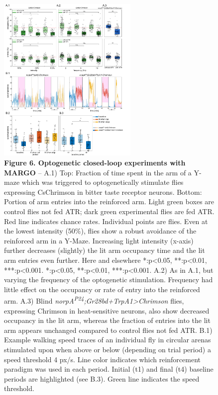 \documentclass[10pt]{article}
\begin{document}
\newpage
\begin{figure}[t!]
	\begin{center}
		\includegraphics[width=0.6\textwidth]{../figures/optogenetics_fig_sm.pdf}
	\end{center}
	\caption*{\footnotesize \textbf{Figure 6. Optogenetic closed-loop experiments with MARGO} -- A.1) Top: Fraction of time spent in the arm of a Y-maze which was triggered to optogenetically stimulate flies expressing CsChrimson in bitter taste receptor neurons. Bottom: Portion of arm entries into the reinforced arm. Light green boxes are control flies not fed ATR; dark green experimental flies are fed ATR. Red line indicates chance rates. Individual points are flies. Even at the lowest intensity (50\%), flies show a robust avoidance of the reinforced arm in a Y-Maze. Increasing light intensity (x-axis) further decreases (slightly) the lit arm occupancy time and the lit arm entries even further. Here and elsewhere *:p<0.05, **:p<0.01, ***:p<0.001. *:p<0.05, **:p<0.01, ***:p<0.001. 
	A.2) As in A.1, but varying the frequency of the optogenetic stimulation. Frequency had little effect on the occupancy or rate of entry into the reinforced arm. 
	A.3) Blind \textit{norpA\textsuperscript{P24};Gr28bd+TrpA1>Chrimson} flies, expressing Chrimson in heat-sensitive neurons, also show decreased occupancy in the lit arm, whereas the fraction of entries into the lit arm appears unchanged compared to control flies not fed ATR. 
	B.1) Example walking speed traces of an individual fly in circular arenas stimulated upon when above or below (depending on trial period) a speed threshold 4 px/s. Line color indicates which reinforcement paradigm was used in each period. Initial (t1) and final (t4) baseline periods are highlighted (see B.3). Green line indicates the speed threshold.
}
\end{figure}
\end{document}
